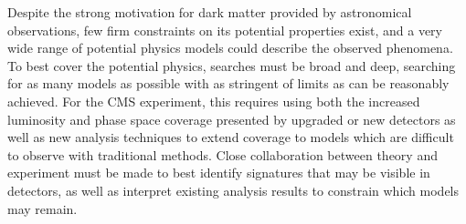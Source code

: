 Despite the strong motivation for dark matter provided by astronomical observations, few firm constraints on its potential properties exist, and a very wide range of potential physics models could describe the observed phenomena.
To best cover the potential physics, searches must be broad and deep, searching for as many models as possible with as stringent of limits as can be reasonably achieved.
For the CMS experiment, this requires using both the increased luminosity and phase space coverage presented by upgraded or new detectors as well as new analysis techniques to extend coverage to models which are difficult to observe with traditional methods. 
Close collaboration between theory and experiment must be made to best identify signatures that may be visible in detectors, as well as interpret existing analysis results to constrain which models may remain.



